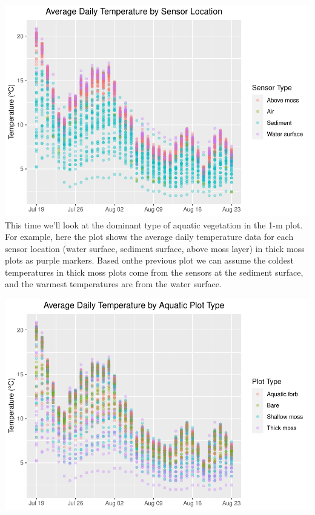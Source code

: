 \documentclass[
]{article}
\begin{document}
\includegraphics{iButtons2022-2-17_files/figure-latex/unnamed-chunk-17-1.pdf}
This time we'll look at the dominant type of aquatic vegetation in the
1-m plot. For example, here the plot shows the average daily temperature
data for each sensor location (water surface, sediment surface, above
moss layer) in thick moss plots as purple markers. Based onthe previous
plot we can assume the coldest temperatures in thick moss plots come
from the sensors at the sediment surface, and the warmest temperatures
are from the water surface.

\includegraphics{iButtons2022-2-17_files/figure-latex/unnamed-chunk-19-1.pdf}
\end{document}
